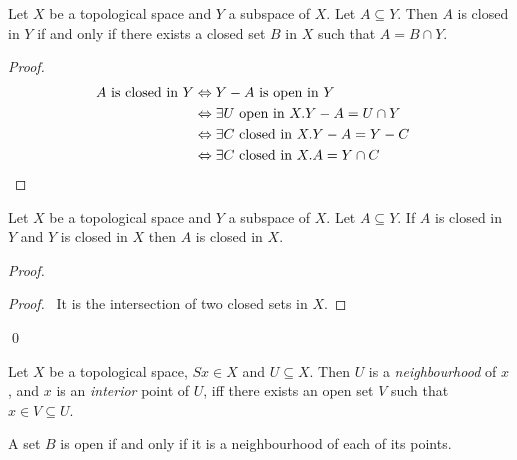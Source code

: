 \begin{prop}
Let $X$ be a topological space and $Y$ a subspace of $X$. Let $A \subseteq Y$. Then $A$ is closed in $Y$ if and only if there exists a closed set $B$ in $X$ such that $A = B \cap Y$.
\end{prop}

\begin{proof}
\pf
\begin{align*}
A \text{ is closed in } Y & \Leftrightarrow Y - A \text{ is open in } Y \\
& \Leftrightarrow \exists U \text{ open in } X. Y - A = U \cap Y \\
& \Leftrightarrow \exists C \text{ closed in } X. Y - A = Y - C \\
& \Leftrightarrow \exists C \text{ closed in } X. A = Y \cap C & \qed
\end{align*}
\end{proof}

\begin{prop}
Let $X$ be a topological space and $Y$ a subspace of $X$. Let $A \subseteq Y$. If $A$ is closed in $Y$ and $Y$ is closed in $X$ then $A$ is closed in $X$.
\end{prop}

\begin{proof}
\pf
{}
\begin{proof}
	\pf\ It is the intersection of two closed sets in $X$.
\end{proof}
\qed
\end{proof}

\begin{df}[Neighbourhood]
Let $X$ be a topological space, $Sx \in X$ and $U \subseteq X$. Then $U$ is a \emph{neighbourhood} of $x$, and $x$ is an \emph{interior} point of $U$, iff there exists an open set $V$ such that $x \in V \subseteq U$.
\end{df}

\begin{prop}
A set $B$ is open if and only if it is a neighbourhood of each of its points.
\end{prop}

